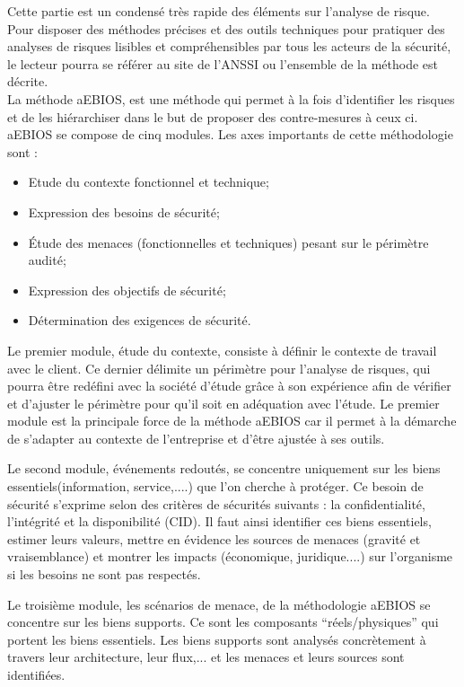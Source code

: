 Cette partie est un condensé très rapide des éléments sur l'analyse de risque. Pour disposer des méthodes précises et des outils techniques pour pratiquer des analyses de risques lisibles et compréhensibles par tous les acteurs de la sécurité, le lecteur pourra se référer au site de l’ANSSI ou l’ensemble de la méthode  est décrite.\\

La méthode  \gls{aEBIOS}, est une méthode qui permet à la fois d’identifier les risques et de les hiérarchiser dans le but de proposer des contre-mesures à ceux ci. 
\gls{aEBIOS} se compose de cinq modules. Les axes importants de cette méthodologie sont :

\begin{itemize}
  \item Etude du contexte fonctionnel et technique;
  \item Expression des besoins de sécurité;
  \item Étude des menaces (fonctionnelles et techniques) pesant sur le périmètre audité;
  \item Expression des objectifs de sécurité;
  \item Détermination des exigences de sécurité.
\end{itemize}

Le premier module, étude du contexte, consiste à définir le contexte de travail avec le client. Ce dernier délimite un périmètre pour l’analyse de risques, qui pourra être redéfini avec la société d’étude grâce à son expérience afin de vérifier et d’ajuster le périmètre pour qu’il soit en adéquation avec l’étude. Le premier module est la principale force de la méthode \gls{aEBIOS} car il permet à la démarche de s’adapter au contexte de l’entreprise et d’être ajustée à ses outils.

Le second module, événements redoutés, se concentre uniquement sur les biens essentiels(information, service,....) que l’on cherche à protéger. Ce besoin de sécurité s’exprime selon des critères de sécurités suivants : la confidentialité, l’intégrité et la disponibilité (CID). Il faut ainsi identifier ces biens essentiels, estimer leurs valeurs, mettre en évidence les sources de menaces (gravité et vraisemblance) et montrer les impacts (économique, juridique....) sur l’organisme si les besoins ne sont pas respectés.

Le troisième module, les scénarios de menace, de la méthodologie \gls{aEBIOS} se concentre sur les biens supports. Ce sont les composants “réels/physiques” qui portent les biens essentiels. Les biens supports sont analysés concrètement à travers leur architecture, leur flux,... et les menaces et leurs sources sont identifiées.

